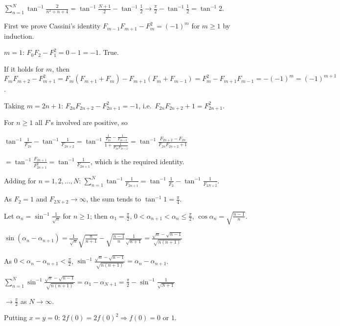   $\displaystyle\sum_{n = 1}^N\tan^{-1}\frac{2}{n^2 + n + 4} = \tan^{-1}\frac{N + 1}{2} -
  \tan^{-1}\frac{1}{2}\rightarrow\frac{\pi}{2} - \tan^{-1}\frac{1}{2} = \tan^{-1}2$.
\item First we prove Cassini's identity $F_{m - 1}F_{m + 1} - F_m^2 = (-1)^m$ for $m\ge 1$ by induction.

  $m = 1$: $F_0F_2 - F_1^2 = 0 - 1 = -1$. True.

  If it holds for $m$, then $F_mF_{m + 2} - F_{m + 1}^2 = F_m(F_{m + 1} + F_m) - F_{m + 1}(F_m + F_{m - 1}) = F_m^2 -
  F_{m + 1}F_{m - 1} = -(-1)^m = (-1)^{m + 1}$.

  Taking $m = 2n + 1$: $F_{2n}F_{2n + 2} - F_{2n + 1}^2 = -1$, i.e.\ $F_{2n}F_{2n + 2} + 1 = F_{2n + 1}^2$.

  For $n\ge 1$ all $F$'s involved are positive, so

  $\tan^{-1}\frac{1}{F_{2n}} - \tan^{-1}\frac{1}{F_{2n + 2}} = \tan^{-1}\frac{\frac{1}{F_{2n}} - \frac{1}{F_{2n +
  2}}}{1 + \frac{1}{F_{2n}F_{2n + 2}}} = \tan^{-1}\frac{F_{2n + 2} - F_{2n}}{F_{2n}F_{2n + 2} + 1}$

  $= \tan^{-1}\frac{F_{2n + 1}}{F_{2n + 1}^2} = \tan^{-1}\frac{1}{F_{2n + 1}}$, which is the required identity.

  Adding for $n = 1, 2, \ldots, N$: $\displaystyle\sum_{n = 1}^N\tan^{-1}\frac{1}{F_{2n + 1}} =
  \tan^{-1}\frac{1}{F_2} - \tan^{-1}\frac{1}{F_{2N + 2}}$.

  As $F_2 = 1$ and $F_{2N + 2}\rightarrow\infty$, the sum tends to $\tan^{-1}1 = \frac{\pi}{4}$.
\item Let $\alpha_n = \sin^{-1}\frac{1}{\sqrt{n}}$ for $n\ge 1$; then $\alpha_1 = \frac{\pi}{2}$, $0 < \alpha_{n +
  1} < \alpha_n\le\frac{\pi}{2}$, $\cos\alpha_n = \sqrt{\frac{n - 1}{n}}$.

  $\sin(\alpha_n - \alpha_{n + 1}) = \frac{1}{\sqrt{n}}\sqrt{\frac{n}{n + 1}} - \sqrt{\frac{n -
  1}{n}}\frac{1}{\sqrt{n + 1}} = \frac{\sqrt{n} - \sqrt{n - 1}}{\sqrt{n(n + 1)}}$

  As $0 < \alpha_n - \alpha_{n + 1} < \frac{\pi}{2}$, $\sin^{-1}\frac{\sqrt{n} - \sqrt{n - 1}}{\sqrt{n(n + 1)}} =
  \alpha_n - \alpha_{n + 1}$.

  $\displaystyle\sum_{n = 1}^N\sin^{-1}\frac{\sqrt{n} - \sqrt{n - 1}}{\sqrt{n(n + 1)}} = \alpha_1 - \alpha_{N + 1}
  = \frac{\pi}{2} - \sin^{-1}\frac{1}{\sqrt{N + 1}}$

  $\rightarrow\frac{\pi}{2}$ as $N\rightarrow\infty$.
\item Putting $x = y = 0$: $2f(0) = 2f(0)^2\Rightarrow f(0) = 0$ or $1$.


